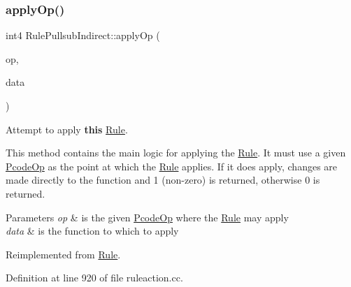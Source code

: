 \subsubsection{\texorpdfstring{applyOp()}{applyOp()}}
{\footnotesize\ttfamily int4 Rule\+Pullsub\+Indirect\+::apply\+Op (\begin{DoxyParamCaption}\item[{\mbox{\hyperlink{class_pcode_op}{Pcode\+Op}} $\ast$}]{op,  }\item[{\mbox{\hyperlink{class_funcdata}{Funcdata}} \&}]{data }\end{DoxyParamCaption})\hspace{0.3cm}{\ttfamily [virtual]}}



Attempt to apply {\bfseries{this}} \mbox{\hyperlink{class_rule}{Rule}}. 

This method contains the main logic for applying the \mbox{\hyperlink{class_rule}{Rule}}. It must use a given \mbox{\hyperlink{class_pcode_op}{Pcode\+Op}} as the point at which the \mbox{\hyperlink{class_rule}{Rule}} applies. If it does apply, changes are made directly to the function and 1 (non-\/zero) is returned, otherwise 0 is returned. 
\begin{DoxyParams}{Parameters}
{\em op} & is the given \mbox{\hyperlink{class_pcode_op}{Pcode\+Op}} where the \mbox{\hyperlink{class_rule}{Rule}} may apply \\
\hline
{\em data} & is the function to which to apply \\
\hline
\end{DoxyParams}


Reimplemented from \mbox{\hyperlink{class_rule_a4e3e61f066670175009f60fb9dc60848}{Rule}}.



Definition at line 920 of file ruleaction.\+cc.

